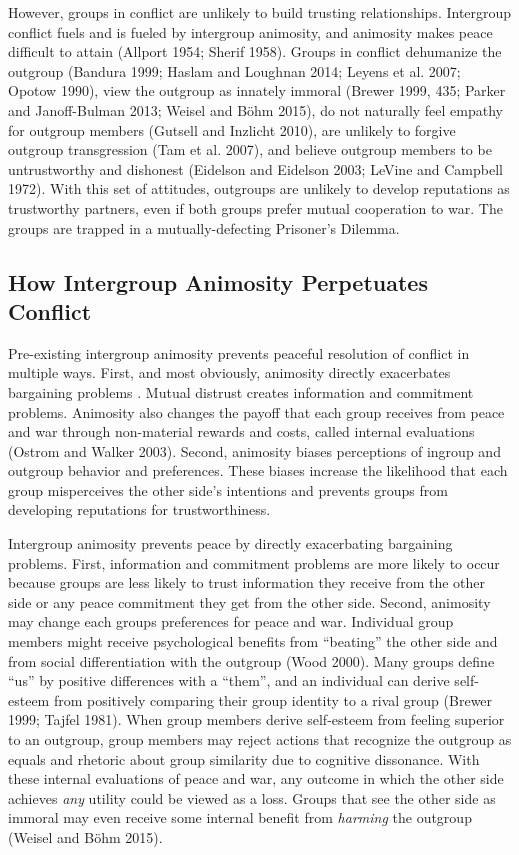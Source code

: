\documentclass[11pt]{article}
\begin{document}
However, groups in conflict are unlikely to build trusting
relationships. Intergroup conflict fuels and is fueled by intergroup
animosity, and animosity makes peace difficult to attain (Allport 1954;
Sherif 1958). Groups in conflict dehumanize the outgroup (Bandura 1999;
Haslam and Loughnan 2014; Leyens et al. 2007; Opotow 1990), view the
outgroup as innately immoral (Brewer 1999, 435; Parker and Janoff-Bulman
2013; Weisel and Böhm 2015), do not naturally feel empathy for outgroup
members (Gutsell and Inzlicht 2010), are unlikely to forgive outgroup
transgression (Tam et al. 2007), and believe outgroup members to be
untrustworthy and dishonest (Eidelson and Eidelson 2003; LeVine and
Campbell 1972). With this set of attitudes, outgroups are unlikely to
develop reputations as trustworthy partners, even if both groups prefer
mutual cooperation to war. The groups are trapped in a
mutually-defecting Prisoner's Dilemma.

\hypertarget{how-intergroup-animosity-perpetuates-conflict}{%
\subsection{How Intergroup Animosity Perpetuates
Conflict}\label{how-intergroup-animosity-perpetuates-conflict}}

Pre-existing intergroup animosity prevents peaceful resolution of
conflict in multiple ways. First, and most obviously, animosity directly
exacerbates bargaining problems . Mutual distrust creates information
and commitment problems. Animosity also changes the payoff that each
group receives from peace and war through non-material rewards and
costs, called internal evaluations (Ostrom and Walker 2003). Second,
animosity biases perceptions of ingroup and outgroup behavior and
preferences. These biases increase the likelihood that each group
misperceives the other side's intentions and prevents groups from
developing reputations for trustworthiness.

Intergroup animosity prevents peace by directly exacerbating bargaining
problems. First, information and commitment problems are more likely to
occur because groups are less likely to trust information they receive
from the other side or any peace commitment they get from the other
side. Second, animosity may change each groups preferences for peace and
war. Individual group members might receive psychological benefits from
``beating'' the other side and from social differentiation with the
outgroup (Wood 2000). Many groups define ``us'' by positive differences
with a ``them'', and an individual can derive self-esteem from
positively comparing their group identity to a rival group (Brewer 1999;
Tajfel 1981). When group members derive self-esteem from feeling
superior to an outgroup, group members may reject actions that recognize
the outgroup as equals and rhetoric about group similarity due to
cognitive dissonance. With these internal evaluations of peace and war,
any outcome in which the other side achieves \emph{any} utility could be
viewed as a loss. Groups that see the other side as immoral may even
receive some internal benefit from \emph{harming} the outgroup (Weisel
and Böhm 2015).
\end{document}
